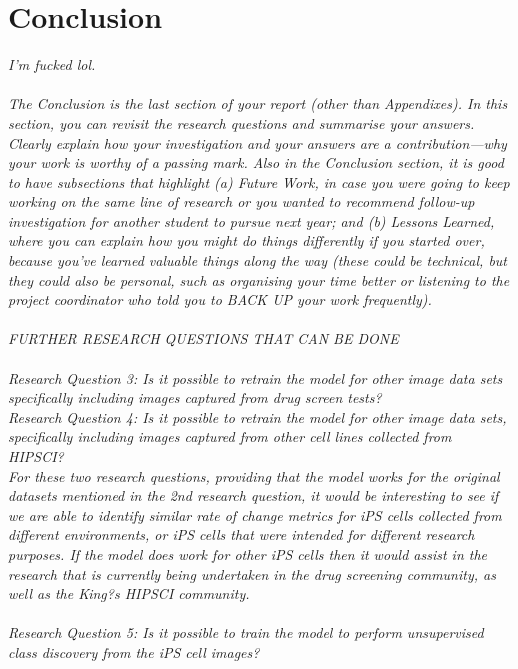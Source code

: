 \section{Conclusion}

\emph{
I'm fucked lol. \\ \\ 
The Conclusion is the last section of your report (other than Appendixes). In this section, you can revisit the research questions and summarise your answers. Clearly explain how your investigation and your answers are a contribution---why your work is worthy of a passing mark. Also in the Conclusion section, it is good to have subsections that highlight (a) Future Work, in case you were going to keep working on the same line of research or you wanted to recommend follow-up investigation for another student to pursue next year; and (b) Lessons Learned, where you can explain how you might do things differently if you started over, because you've learned valuable things along the way (these could be technical, but they could also be personal, such as organising your time better or listening to the project coordinator who told you to BACK UP your work frequently).\\ \\
FURTHER RESEARCH QUESTIONS THAT CAN BE DONE \\ \\
Research Question 3: Is it possible to retrain the model for other image data sets specifically including images captured from drug screen tests? \\ 
 Research Question 4: Is it possible to retrain the model for other image data sets, specifically including images captured from other cell lines collected from HIPSCI? \\ 
 For these two research questions, providing that the model works for the original datasets mentioned in the 2nd research question, it would be interesting to see if we are able to identify similar rate of change metrics for iPS cells collected from different environments, or iPS cells that were intended for different research purposes. If the model does work for other iPS cells then it would assist in the research that is currently being undertaken in the drug screening community, as well as the King?s HIPSCI community. \\ \\ 
Research Question 5: Is it possible to train the model to perform unsupervised class discovery from the iPS cell images? \\ 
}
